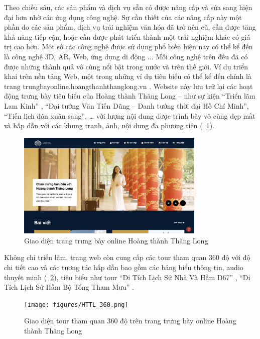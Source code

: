 Theo chiều sâu, các sản phẩm và dịch vụ sẵn có được nâng cấp và sửa sang hiện
đại hơn nhờ các ứng dụng công nghệ. Sự cần thiết của các nâng cấp này một phần do
các sản phẩm, dịch vụ trải nghiệm văn hóa đã trở nên cũ, cần được tăng khả năng tiếp
cận, hoặc cần được phát triển thành một trải nghiệm khác có giá trị cao hơn.
Một số các công nghệ được sử dụng phổ biến hiện nay có thể kể đến là công nghệ
3D, AR, Web, ứng dụng di động ... Mỗi công nghệ trên đều đã có được những thành
quả vô cùng nổi bật trong nước và trên thế giới. Ví dụ triển khai trên nền tảng Web,
một trong những ví dụ tiêu biểu có thể kể đến chính là trang
trungbayonline.hoangthanhthanglong.vn \cite{hoangthanh2022}. Website này lưu trữ lại các hoạt động
trưng bày tiêu biểu của Hoàng thành Thăng Long – như sự kiện “Triển lãm Lam
Kinh” \cite{lamkinh2022}, “Đại tướng Văn Tiến Dũng – Danh tướng thời đại Hồ Chí Minh”\cite{vantien2022}, “Tiến
lịch đón xuân sang”\cite{tetviet2022}, … với lượng nội dung được trình bày vô cùng đẹp mắt và
hấp dẫn với các khung tranh, ảnh, nội dung đa phương tiện (\figurename~\ref{HTTL}).

\begin{figure}[h]
    \centering
    \includegraphics[width=0.8\textwidth]{figures/HTTL.png} %
    \caption{Giao diện trang trưng bày online Hoàng thành Thăng Long \cite{hoangthanh2022}}
    \label{HTTL}
\end{figure}

Không chỉ triển lãm, trang web còn cung cấp các tour tham quan 360 độ với
độ chi tiết cao và các tương tác hấp dẫn bao gồm các bảng biểu thông tin, audio thuyết
minh (\figurename~\ref{HTTL_360}), tiêu biểu như tour “Di Tích Lịch Sử Nhà Và Hầm D67” \cite{d67_2022}, “Di
Tích Lịch Sử Hầm Bộ Tổng Tham Mưu” \cite{bttm2022}.

\begin{figure}[h]
    \centering
    \texttt{[image: figures/HTTL\_360.png]} %
    \caption{Giao diện tour tham quan 360 độ trên trang trưng bày online Hoàng thành Thăng Long \cite{hoangthanh2022}}
    \label{HTTL_360}
\end{figure}

